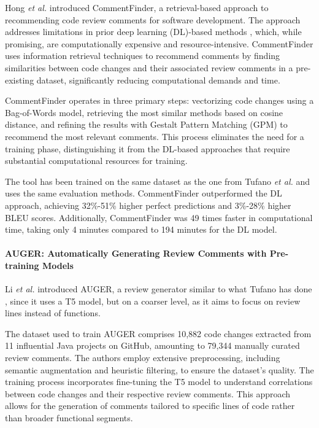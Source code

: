 Hong \emph{et al.} \cite{hong:esecfse2022} introduced CommentFinder, a
retrieval-based approach to recommending code review comments for software
development. The approach addresses limitations in prior deep learning
(DL)-based methods \cite{tufano:icse2022}, which, while promising, are
computationally expensive and resource-intensive. CommentFinder uses
information retrieval techniques to recommend comments by finding similarities
between code changes and their associated review comments in a pre-existing
dataset, significantly reducing computational demands and time.

CommentFinder operates in three primary steps: vectorizing code changes using a
Bag-of-Words model, retrieving the most similar methods based on cosine
distance, and refining the results with Gestalt Pattern Matching (GPM) to
recommend the most relevant comments. This process eliminates the need for a
training phase, distinguishing it from the DL-based approaches that require
substantial computational resources for training.

The tool has been trained on the same dataset as the one from Tufano \textit{et
	al.} \cite{tufano:icse2022} and uses the same evaluation methods. CommentFinder
outperformed the DL approach, achieving 32\%-51\% higher perfect predictions
and 3\%-28\% higher BLEU scores. Additionally, CommentFinder was 49 times
faster in computational time, taking only 4 minutes compared to 194 minutes for
the DL model.

\paragraph{AUGER: Automatically Generating Review Comments with Pre-training Models}

Li \emph{et al.} \cite{li.l:esecfse2022} introduced AUGER, a review generator
similar to what Tufano \etal has done \cite{tufano:icse2022}, since it uses a
T5 model, but on a coarser level, as it aims to focus on review lines instead
of functions.

The dataset used to train AUGER comprises 10,882 code changes extracted from 11
influential Java projects on GitHub, amounting to 79,344 manually curated
review comments. The authors employ extensive preprocessing, including semantic
augmentation and heuristic filtering, to ensure the dataset's quality. The
training process incorporates fine-tuning the T5 model to understand
correlations between code changes and their respective review comments. This
approach allows for the generation of comments tailored to specific lines of
code rather than broader functional segments.

